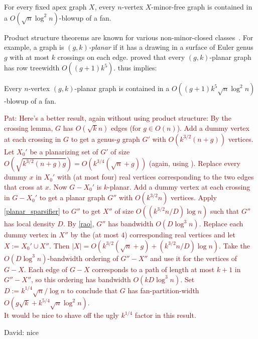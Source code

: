 \documentclass{patmorin}
\newcommand{\david}[1]{{\color{orange} David: #1}}
\newcommand{\pat}[1]{\textcolor{Maroon}{Pat: #1}}
\newcommand{\defin}[1]{\emph{\textcolor{brightmaroon}{#1}}}
\begin{document}
\begin{thm}\label{apex_products}
For every fixed apex graph $X$, every $n$-vertex $X$-minor-free graph is contained in a $O(\sqrt{n}\log^2 n)$-blowup of a fan.
\end{thm}

Product structure theorems are known for various non-minor-closed classes~\citep{dujmovic.morin.ea:graph,HW24,distel.hickingbotham.ea:powers}. For example, a graph is \defin{$(g,k)$-planar} if it has a drawing in a surface of Euler genus $g$ with at most $k$ crossings on each edge. \citet{dujmovic.morin.ea:graph} proved that every $(g,k)$-planar graph has row treewidth  $O((g+1)k^5)$.  thus implies:

\begin{thm}\label{gkplanar_products}
Every $n$-vertex $(g,k)$-planar graph is contained in a $O((g+1)k^5\sqrt{n}\log^2 n)$-blowup of a fan.
\end{thm}

\pat{Here's a better result, again without using product structure:  By the crossing lemma, $G$ has $O(\sqrt{k} n)$ edges (for $g\in O(n)$).  Add a dummy vertex at each crossing in $G$ to get a genus-$g$ graph $G'$ with $O(k^{3/2}(n+g))$ vertices.  Let $X_0'$ be a planarizing set of $G'$ of size $O(\sqrt{k^{3/2}(n+g)g})=O(k^{3/4}(\sqrt{n}+g))$ (again, using \citet{eppstein:dynamic}). Replace every dummy $x$ in $X_0'$ with (at most four) real vertices corresponding to the two edges that cross at $x$.  Now $G-X_0'$ is $k$-planar.  Add a dummy vertex at each crossing in $G-X_0'$ to get a planar graph $G''$ with $O(k^{3/2}n)$ vertices. Apply \cref{planar_sparsifier} to $G''$ to get $X''$ of size $O((k^{3/2}n/D)\log n)$ such that $G''$ has local density $D$.  By \cref{rao}, $G''$ has bandwidth $O(D\log^3 n)$.  Replace each dummy vertex in $X''$ by the (at most $4$) corresponding real vertices and let $X:=X_0'\cup X''$.  Then $|X|=O(k^{3/2}(\sqrt{n}+g)+(k^{3/2}n/D)\log n)$.  Take the $O(D\log^3 n)$-bandwidth ordering of $G''-X''$ and use it for the vertices of $G-X$.  Each edge of $G-X$ corresponds to a path of length at most $k+1$ in $G''-X''$, so this ordering has bandwidth $O(kD\log^3 n)$.  Set $D:=k^{1/4}\sqrt{n}/\log n$ to conclude that $G$ has fan-partition-width $O(g\sqrt{k} + k^{5/4}\sqrt{n}\log^2 n)$.\\[2ex]
It would be nice to shave off the ugly $k^{1/4}$ factor in this result.} 

\david{nice}

\end{document}
